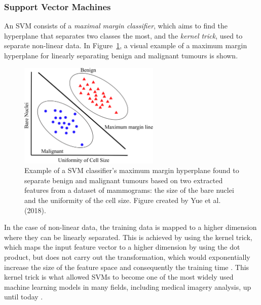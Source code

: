 \subsubsection{Support Vector Machines}
\label{sec:litsurvey-svms}

An SVM consists of a \textit{maximal margin classifier}, which aims to find the hyperplane that separates two classes the most, and the \textit{kernel trick}, used to separate non-linear data. In Figure~\ref{fig:litsurvey-svm-example}, a visual example of a maximum margin hyperplane for linearly separating benign and malignant tumours is shown.\\

\begin{figure}[ht]
\centerline{\includegraphics[width=0.6\textwidth]{figures/litsurvey/svm.png}}
\caption{\label{fig:litsurvey-svm-example}Example of a SVM classifier's maximum margin hyperplane found to separate benign and malignant tumours based on two extracted features from a dataset of mammograms: the size of the bare nuclei and the uniformity of the cell size. Figure created by Yue et al. (2018).}
\end{figure}

In the case of non-linear data, the training data is mapped to a higher dimension where they can be linearly separated. This is achieved by using the kernel trick, which maps the input feature vector to a higher dimension by using the dot product, but does not carry out the transformation, which would exponentially increase the size of the feature space and consequently the training time \citep{Geron2019}. This kernel trick is what allowed SVMs to become one of the most widely used machine learning models in many fields, including medical imagery analysis, up until today \citep{Yue2018}.\\

